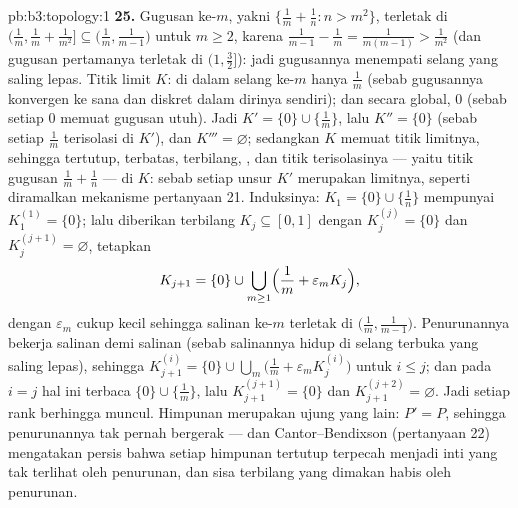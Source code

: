 \begin{solution}{pb:b3:topology:1}
\textbf{25.} Gugusan ke-$m$, yakni $\{\frac1m + \frac1n : n >
m^2\}$, terletak di $\bigl(\frac1m, \frac1m + \frac1{m^2}\bigr]
\subseteq \bigl(\frac1m, \frac1{m-1}\bigr)$ untuk $m \geq 2$,
karena $\frac1{m-1} - \frac1m = \frac1{m(m-1)} >
\frac1{m^2}$ (dan gugusan pertamanya terletak di $(1, \frac32]$):
jadi gugusannya menempati selang yang saling lepas. Titik limit $K$:
di dalam selang ke-$m$ hanya $\frac1m$ (sebab gugusannya
konvergen ke sana dan diskret dalam dirinya sendiri); dan secara global, $0$
(sebab setiap  $0$ memuat gugusan utuh). Jadi $K'
= \{0\} \cup \{\frac1m\}$, lalu $K'' = \{0\}$ (sebab setiap $\frac1m$
terisolasi di $K'$), dan $K''' = \varnothing$; sedangkan $K$ memuat titik
limitnya, sehingga tertutup, terbatas, terbilang, ,
dan titik terisolasinya --- yaitu titik gugusan $\frac1m +
\frac1n$ ---  di $K$: sebab setiap unsur $K'$ merupakan
limitnya, seperti diramalkan mekanisme pertanyaan 21. Induksinya:
$K_1 = \{0\}\cup\{\frac1n\}$ mempunyai $K_1^{(1)} = \{0\}$; lalu diberikan
 terbilang $K_j \subseteq [0, 1]$ dengan $K_j^{(j)} =
\{0\}$ dan $K_j^{(j+1)} = \varnothing$, tetapkan
\[
K_{j+1} = \{0\} \cup \bigcup_{m \geq 1}
\Bigl(\frac1m + \varepsilon_m K_j\Bigr),
\]
dengan $\varepsilon_m$ cukup kecil sehingga salinan ke-$m$ terletak
di $\bigl(\frac1m, \frac1{m-1}\bigr)$. Penurunannya bekerja salinan
demi salinan (sebab salinannya hidup di selang terbuka yang saling lepas), sehingga
$K_{j+1}^{(i)} = \{0\} \cup \bigcup_m\bigl(\frac1m +
\varepsilon_mK_j^{(i)}\bigr)$ untuk $i \leq j$; dan pada $i = j$ hal ini
terbaca $\{0\} \cup \{\frac1m\}$, lalu $K_{j+1}^{(j+1)} =
\{0\}$ dan $K_{j+1}^{(j+2)} = \varnothing$. Jadi setiap rank berhingga
muncul. Himpunan  merupakan ujung yang lain: $P' = P$, sehingga
penurunannya tak pernah bergerak --- dan Cantor--Bendixson (pertanyaan
22) mengatakan persis bahwa setiap himpunan tertutup terpecah menjadi
inti  yang tak terlihat oleh penurunan, dan sisa
terbilang yang dimakan habis oleh penurunan.

\end{solution}
